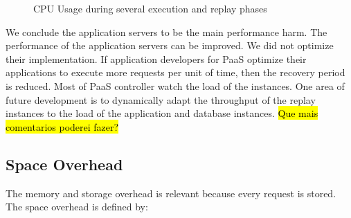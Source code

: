 \begin{figure}[!htb]
  \centering
  \caption{CPU Usage during several execution and replay phases}
  \label{fig:scalability:cpu}
\end{figure}





We conclude the application servers to be the main performance harm. The performance of the application servers can be improved. We did not optimize their implementation. If application developers for \ac{PaaS} optimize their applications to execute more requests per unit of time, then the recovery period is reduced. %
Most of \ac{PaaS} controller watch the load of the instances. One area of future development is to dynamically adapt the throughput of the replay instances to the load of the application and database instances. 
\hl{Que mais comentarios poderei fazer?}





\subsection{Space Overhead}\label{sec:eval:storage}
The memory and storage overhead is relevant because every request is stored. The space overhead is defined by:

